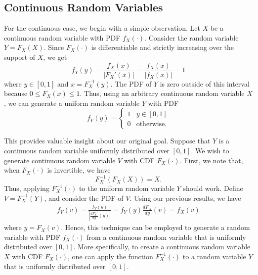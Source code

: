 \subsection{Continuous Random Variables}

For the continuous case, we begin with a simple observation.
Let $X$ be a continuous random variable with PDF $f_X (\cdot)$.
Consider the random variable $Y = F_X(X)$.
Since $F_X (\cdot)$ is differentiable and strictly increasing over the support of $X$, we get
\begin{equation*}
f_Y (y) = \frac{f_X (x)}{| F_X'(x) |}
= \frac{f_X (x)}{| f_X (x) |} = 1
\end{equation*}
where $y \in [0, 1]$ and $x = F_X^{-1} (y)$.
The PDF of $Y$ is zero outside of this interval because $0 \leq F_X (x) \leq 1$.
Thus, using an arbitrary continuous random variable $X$, we can generate a uniform random variable $Y$ with PDF
\begin{equation*}
f_Y(y) = \begin{cases} 1 & y \in [0,1] \\
0 & \text{otherwise} . \end{cases}
\end{equation*}

This provides valuable insight about our original goal.
Suppose that $Y$ is a continuous random variable uniformly distributed over $[0,1]$.
We wish to generate continuous random variable $V$ with CDF $F_X(\cdot)$.
First, we note that, when $F_X (\cdot)$ is invertible, we have
\begin{equation*}
F_X^{-1} \left( F_X (X) \right) = X .
\end{equation*}
Thus, applying $F_X^{-1} (\cdot)$ to the uniform random variable $Y$ should work.
Define $V = F_X^{-1} (Y)$, and consider the PDF of $V$.
Using our previous results, we have
\begin{equation*}
\begin{split}
f_V (v) = \frac{ f_Y (y) }{ \left| \frac{d F_X^{-1}}{dy} (y) \right| }
= f_Y (y) \frac{d F_X}{dy} (v) = f_X (v)
\end{split}
\end{equation*}
where $y = F_X (v)$.
Hence, this technique can be employed to generate a random variable with PDF $f_X (\cdot)$ from a continuous random variable that is uniformly distributed over $[0,1]$.
More specifically, to create a continuous random variable $X$ with CDF $F_X (\cdot)$, one can apply the function $F_X^{-1} (\cdot)$ to a random variable $Y$ that is uniformly distributed over $[0,1]$.

